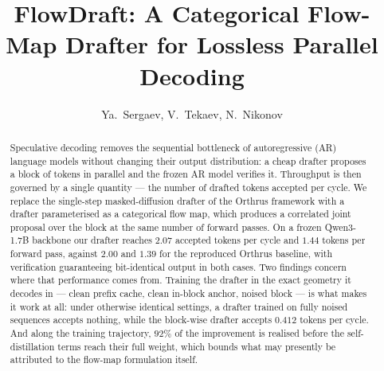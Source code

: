 \documentclass{zapiski}
\date{}
\newcommand{\cm}[1]{\textcolor{red}{#1}}
\begin{document}
\title[FlowDraft]{FlowDraft: A Categorical Flow-Map Drafter for Lossless Parallel Decoding}

\author[Sergaev et al.]{Ya.~Sergaev, V.~Tekaev, N.~Nikonov}
\address[Ya.~Sergaev]{\cm{affiliation}}
\email{\cm{email}}


\begin{abstract}
Speculative decoding removes the sequential bottleneck of autoregressive (AR)
language models without changing their output distribution: a cheap drafter
proposes a block of tokens in parallel and the frozen AR model verifies it.
Throughput is then governed by a single quantity --- the number of drafted
tokens accepted per cycle. We replace the single-step masked-diffusion drafter
of the Orthrus framework with a drafter parameterised as a categorical flow
map, which produces a correlated joint proposal over the block at the same
number of forward passes. On a frozen Qwen3-1.7B backbone our drafter reaches
$2.07$ accepted tokens per cycle and $1.44$ tokens per forward pass, against
$2.00$ and $1.39$ for the reproduced Orthrus baseline, with verification
guaranteeing bit-identical output in both cases. Two findings concern where
that performance comes from. Training the drafter in the exact geometry it
decodes in --- clean prefix cache, clean in-block anchor, noised block --- is
what makes it work at all: under otherwise identical settings, a drafter
trained on fully noised sequences accepts nothing, while the block-wise
drafter accepts $0.412$ tokens per cycle. And along the training trajectory,
$92\%$ of the improvement is realised before the self-distillation terms reach
their full weight, which bounds what may presently be attributed to the
flow-map formulation itself.
\end{abstract}


\maketitle

\end{document}

